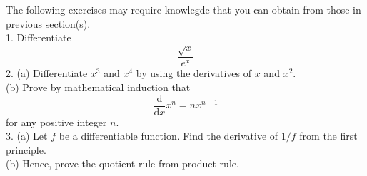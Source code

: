 The following exercises may require knowlegde that you can obtain from those in previous section(s).\\
1. Differentiate
$$\frac{\sqrt x}{e^x}$$
2. (a) Differentiate $x^3$ and $x^4$ by using the derivatives of $x$ and $x^2$.\\
(b) Prove by mathematical induction that
$$\frac{\mathrm d}{\mathrm dx}x^n=nx^{n-1}$$
for any positive integer $n$.\\
3. (a) Let $f$ be a differentiable function. Find the derivative of $1/f$ from the first principle.\\
(b) Hence, prove the quotient rule from product rule.